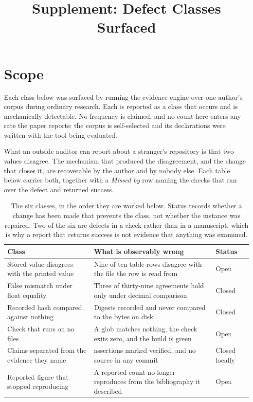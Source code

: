 \documentclass[11pt]{article}
\title{Supplement: Defect Classes Surfaced}
\author{}
\date{}
\begin{document}
\maketitle

\section*{Scope}

Each class below was surfaced by running the evidence engine over one author's corpus during
ordinary research. Each is reported as a class that occurs and is mechanically detectable.
No frequency is claimed, and no count here enters any rate the paper reports: the corpus is
self-selected and its declarations were written with the tool being evaluated.

What an outside auditor can report about a stranger's repository is that two values disagree.
The mechanism that produced the disagreement, and the change that closes it, are recoverable by
the author and by nobody else. Each table below carries both, together with a \emph{Missed by}
row naming the checks that ran over the defect and returned success.

\begin{table}[H]
\centering\small
\renewcommand{\arraystretch}{1.2}\setlength{\tabcolsep}{5pt}
\begin{tabular}{@{}>{\raggedright\arraybackslash}p{5.2cm}>{\raggedright\arraybackslash}p{7.8cm}>{\raggedright\arraybackslash}p{2.3cm}@{}}
\toprule
\textbf{Class} & \textbf{What is observably wrong} & \textbf{Status} \\
\midrule
Stored value disagrees with the printed value & Nine of ten table rows disagree with the file the row is read from & Open \\
False mismatch under float equality & Three of thirty-nine agreements hold only under decimal comparison & Closed \\
Recorded hash compared against nothing & Digests recorded and never compared to the bytes on disk & Closed \\
Check that runs on no files & A glob matches nothing, the check exits zero, and the build is green & Open \\
Claims separated from the evidence they name & 178 assertions marked verified, and no source in any commit & Closed locally \\
Reported figure that stopped reproducing & A reported count no longer reproduces from the bibliography it described & Open \\
\bottomrule
\end{tabular}
\caption{The six classes, in the order they are worked below. Status records whether a change
has been made that prevents the class, not whether the instance was repaired. Two of the six are
defects in a check rather than in a manuscript, which is why a report that returns success is
not evidence that anything was examined.}
\label{tab:defect-summary}
\end{table}
\end{document}
